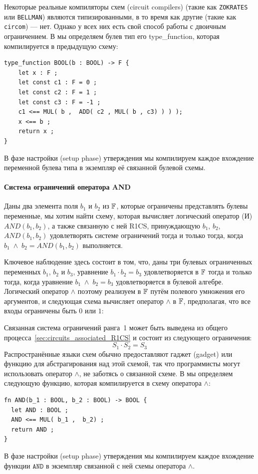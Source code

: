 Некоторые реальные компиляторы схем (circuit compilers) (такие как \texttt{ZOKRATES} или \texttt{BELLMAN}) являются типизированными, в то время как другие (такие как \texttt{circom}) --- нет. Однако у всех них есть свой способ работы с двоичным ограничением. В  мы определяем булев тип его type\_function, которая компилируется в предыдущую схему:
\begin{lstlisting}
type_function BOOL(b : BOOL) -> F { 
	let x : F ;
	let const c1 : F = 0 ;
	let const c2 : F = 1 ;
	let const c3 : F = -1 ;
    c1 <== MUL( b ,  ADD( c2 , MUL( b , c3) ) ) );
    x <== b ;
    return x ;
}
\end{lstlisting}
В фазе настройки (setup phase) утверждения мы компилируем каждое вхождение переменной булева типа в экземпляр её связанной булевой схемы.
\paragraph{Система ограничений оператора AND} Даны два элемента поля $b_1$ и $b_2$ из $\mathbb{F}$, которые ограничены представлять булевы переменные, мы хотим найти схему, которая вычисляет логический оператор  (И) $AND(b_1,b_2)$, а также связанную с ней R1CS, принуждающую $b_1$, $b_2$, $AND(b_1,b_2)$ удовлетворять системе ограничений тогда и только тогда, когда $b_1\; \wedge \; b_2 =AND(b_1,b_2)$ выполняется.

Ключевое наблюдение здесь состоит в том, что, даны три булевых ограниченных переменных $b_1$, $b_2$ и $b_3$, уравнение $b_1\cdot b_2 = b_3$ удовлетворяется в $\mathbb{F}$ тогда и только тогда, когда уравнение $b_1\; \wedge \; b_2 = b_3$ удовлетворяется в булевой алгебре. Логический оператор $\wedge$ поэтому реализуем в $\mathbb{F}$ путём полевого умножения его аргументов, и следующая схема вычисляет оператор $\wedge$ в $\mathbb{F}$, предполагая, что все входы ограничены быть $0$ или $1$:
\begin{center}
\end{center}
Связанная система ограничений ранга~1 может быть выведена из общего процесса~\ref{sec:circuits_associated_R1CS} и состоит из следующего ограничения:
\begin{equation}
 S_1 \cdot S_2 = S_3
\end{equation}
Распространённые языки схем обычно предоставляют гаджет (gadget) или функцию для абстрагирования над этой схемой, так что программисты могут использовать оператор $\wedge$, не заботясь о связанной схеме. В  мы определяем следующую функцию, которая компилируется в схему оператора $\wedge$:
\begin{lstlisting}
fn AND(b_1 : BOOL, b_2 : BOOL) -> BOOL {
  let AND : BOOL ;
  AND <== MUL( b_1 ,  b_2) ;
  return AND ;
}
\end{lstlisting}
В фазе настройки (setup phase) утверждения мы компилируем каждое вхождение функции $\mathtt{AND}$ в экземпляр связанной с ней схемы оператора $\wedge$.
